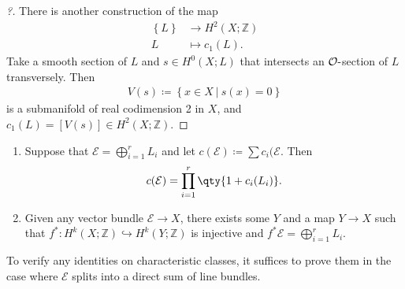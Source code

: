 \begin{proof}[?]
There is another construction of the map
\begin{align*}
\left\{{L}\right\} &\to H^2(X; {\mathbb{Z}}) \\
L &\mapsto c_1(L)
.\end{align*}
Take a smooth section of \(L\) and \(s\in H^0(X; L)\) that intersects an
\({\mathcal{O}}{\hbox{-}}\)section of \(L\) transversely. Then
\begin{align*}
V(s) \coloneqq\left\{{ x\in X {~\mathrel{\Big|}~}s(x) = 0 }\right\}
\end{align*}
is a submanifold of real codimension 2 in \(X\), and
\(c_1(L) = [ V(s) ] \in H^2(X; {\mathbb{Z}})\).

\end{proof}

\begin{theorem}

\envlist

\begin{enumerate}
\def\labelenumi{\arabic{enumi}.}
\item
  Suppose that \(\mathcal{E} = \bigoplus_{i=1}^r L_i\) and let
  \(c(\mathcal{E}) \coloneqq\sum c_i(\mathcal{E}\). Then
  \begin{align*}
    c(\mathcal{E}) = \prod_{i=1}^r \qty{ 1 + c_i (L_i) }
    .\end{align*}
\item
  Given any vector bundle \(\mathcal{E} \to X\), there exists some \(Y\)
  and a map \(Y\to X\) such that
  \(f^*: H^k(X; {\mathbb{Z}}) \hookrightarrow H^k(Y; {\mathbb{Z}})\) is
  injective and \(f^* \mathcal{E} = \bigoplus_{i=1}^r L_i\).
\end{enumerate}

\end{theorem}

\begin{slogan}

To verify any identities on characteristic classes, it suffices to prove
them in the case where \(\mathcal{E}\) splits into a direct sum of line
bundles.

\end{slogan}

